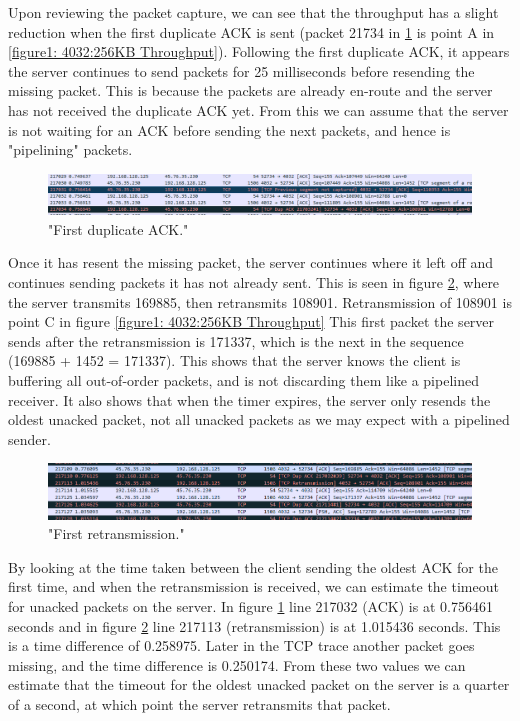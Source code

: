 \documentclass[12pt]{article}
\begin{document}
Upon reviewing the packet capture, we can see that the throughput has a slight reduction when the first duplicate ACK is sent (packet 21734 in \ref{figure2: first duplicate ACK} is point A in \ref{figure1: 4032:256KB Throughput}).
Following the first duplicate ACK, it appears the server continues to send packets for 25 milliseconds before resending the missing packet.
This is because the packets are already en-route and the server has not received the duplicate ACK yet. 
From this we can assume that the server is not waiting for an ACK before sending the next packets, and hence is "pipelining" packets.

\begin{figure}[!htbp]
  \centering
  \includegraphics[width=\linewidth]{4032-256KB-duplicate-ack.PNG}
  \caption{"First duplicate ACK."}
  \label{figure2: first duplicate ACK}
\end{figure}

Once it has resent the missing packet, the server continues where it left off and continues sending packets it has not already sent.
This is seen in figure \ref{figure3: First retransmission}, where the server transmits 169885, then retransmits 108901.
Retransmission of 108901 is point C in figure \ref{figure1: 4032:256KB Throughput}
This first packet the server sends after the retransmission is 171337, which is the next in the sequence (169885 + 1452 = 171337).
This shows that the server knows the client is buffering all out-of-order packets, and is not discarding them like a pipelined receiver.
It also shows that when the timer expires, the server only resends the oldest unacked packet, not all unacked packets as we may expect with a pipelined sender.

\begin{figure}[!htbp]
  \centering
  \includegraphics[width=\linewidth]{4032-256KB-retransmission.PNG}
  \caption{"First retransmission."}
  \label{figure3: First retransmission}
\end{figure}

By looking at the time taken between the client sending the oldest ACK for the first time, and when the retransmission is received, we can estimate the timeout for unacked packets on the server.
In figure \ref{figure2: first duplicate ACK} line 217032 (ACK) is at 0.756461 seconds and in figure \ref{figure3: First retransmission} line 217113 (retransmission) is at 1.015436 seconds.
This is a time difference of 0.258975.
Later in the TCP trace another packet goes missing, and the time difference is 0.250174.
From these two values we can estimate that the timeout for the oldest unacked packet on the server is a quarter of a second, at which point the server retransmits that packet.
\end{document}
